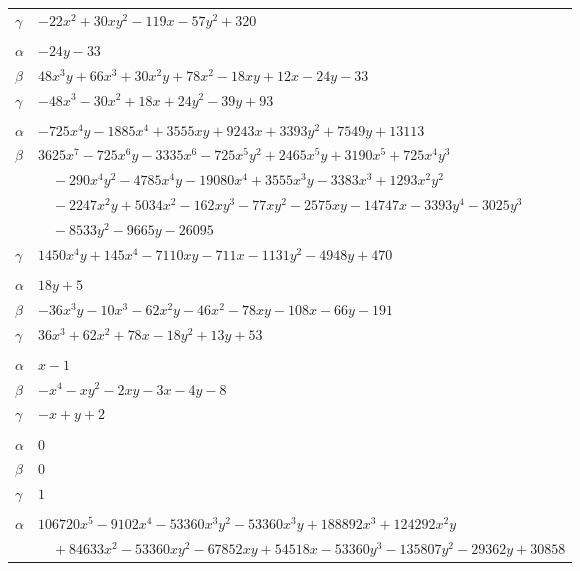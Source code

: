 \documentclass[11pt]{article}
\begin{document}
\begin{longtable}{@{}ll@{}}
$\gamma$ & $-22x^{2}+30xy^{2}-119x-57y^{2}+320$\\
\addlinespace[3pt]
\multicolumn{2}{@{}l}{$\{i,j\}=\{45,68\}$, $k_{ij}=3\cdot 7^{2}$}\\
$\alpha$ & $-24y-33$\\
$\beta$ & $48x^{3}y+66x^{3}+30x^{2}y+78x^{2}-18xy+12x-24y-33$\\
$\gamma$ & $-48x^{3}-30x^{2}+18x+24y^{2}-39y+93$\\
\addlinespace[3pt]
\multicolumn{2}{@{}l}{$\{i,j\}=\{45,123\}$, $k_{ij}=2^{2}\cdot 7\cdot 11\cdot 43$}\\
$\alpha$ & $-725x^{4}y-1885x^{4}+3555xy+9243x+3393y^{2}+7549y+13113$\\
$\beta$ & $3625x^{7}-725x^{6}y-3335x^{6}-725x^{5}y^{2}+2465x^{5}y+3190x^{5}+725x^{4}y^{3}$\\
 & $\quad -290x^{4}y^{2}-4785x^{4}y-19080x^{4}+3555x^{3}y-3383x^{3}+1293x^{2}y^{2}$\\
 & $\quad -2247x^{2}y+5034x^{2}-162xy^{3}-77xy^{2}-2575xy-14747x-3393y^{4}-3025y^{3}$\\
 & $\quad -8533y^{2}-9665y-26095$\\
$\gamma$ & $1450x^{4}y+145x^{4}-7110xy-711x-1131y^{2}-4948y+470$\\
\addlinespace[3pt]
\multicolumn{2}{@{}l}{$\{i,j\}=\{46,59\}$, $k_{ij}=7\cdot 37$}\\
$\alpha$ & $18y+5$\\
$\beta$ & $-36x^{3}y-10x^{3}-62x^{2}y-46x^{2}-78xy-108x-66y-191$\\
$\gamma$ & $36x^{3}+62x^{2}+78x-18y^{2}+13y+53$\\
\addlinespace[3pt]
\multicolumn{2}{@{}l}{$\{i,j\}=\{46,80\}$, $k_{ij}=7$}\\
$\alpha$ & $x-1$\\
$\beta$ & $-x^{4}-xy^{2}-2xy-3x-4y-8$\\
$\gamma$ & $-x+y+2$\\
\addlinespace[3pt]
\multicolumn{2}{@{}l}{$\{i,j\}=\{46,187\}$, $k_{ij}=3\cdot 7$}\\
$\alpha$ & $0$\\
$\beta$ & $0$\\
$\gamma$ & $1$\\
\addlinespace[3pt]
\multicolumn{2}{@{}l}{$\{i,j\}=\{52,53\}$, $k_{ij}=2^{3}\cdot 3^{2}\cdot 5\cdot 7^{2}$}\\
$\alpha$ & $106720x^{5}-9102x^{4}-53360x^{3}y^{2}-53360x^{3}y+188892x^{3}+124292x^{2}y$\\
 & $\quad +84633x^{2}-53360xy^{2}-67852xy+54518x-53360y^{3}-135807y^{2}-29362y+30858$\\

\end{longtable}
\end{document}
